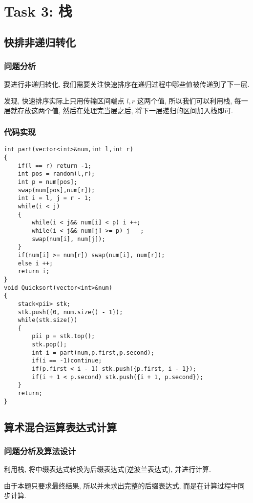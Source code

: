 \section{Task 3: 栈}

\subsection{快排非递归转化}

\subsubsection{问题分析}

要进行非递归转化, 我们需要关注快速排序在递归过程中哪些值被传递到了下一层.

发现, 快速排序实际上只用传输区间端点 $l,r$ 这两个值, 所以我们可以利用栈, 每一层就存放这两个值, 然后在处理完当层之后, 将下一层递归的区间加入栈即可.

\subsubsection{代码实现}

\begin{lstlisting}
int part(vector<int>&num,int l,int r)
{
	if(l == r) return -1;
	int pos = random(l,r);
	int p = num[pos];
	swap(num[pos],num[r]);
	int i = l, j = r - 1;
	while(i < j)
	{
		while(i < j&& num[i] < p) i ++;
		while(i < j&& num[j] >= p) j --;
		swap(num[i], num[j]);
	}
	if(num[i] >= num[r]) swap(num[i], num[r]);
	else i ++;
	return i;
}
void Quicksort(vector<int>&num)
{
	stack<pii> stk;
	stk.push({0, num.size() - 1});
	while(stk.size())
	{
		pii p = stk.top();
		stk.pop();
		int i = part(num,p.first,p.second);
		if(i == -1)continue;
		if(p.first < i - 1) stk.push({p.first, i - 1});
		if(i + 1 < p.second) stk.push({i + 1, p.second});
	}
	return;
}
\end{lstlisting} 

\subsection{算术混合运算表达式计算}

\subsubsection{问题分析及算法设计}

利用栈, 将中缀表达式转换为后缀表达式(逆波兰表达式), 并进行计算.

由于本题只要求最终结果, 所以并未求出完整的后缀表达式, 而是在计算过程中同步计算.

